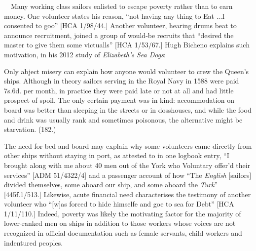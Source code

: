 \begin{styleStandard}
\ \  Many working class sailors enlisted to escape poverty rather than to earn money. One volunteer states his reason, “not having any thing to Eat ...I consented to goo” [HCA 1/98/44.] Another volunteer, hearing drums beat to announce recruitment, joined a group of would-be recruits that “desired the master to give them some victualls” [HCA 1/53/67.] Hugh Bicheno explains such motivation, in his 2012 study of \textit{Elizabeth’s Sea Dogs}:
\end{styleStandard}

\begin{styleStandard}
Only abject misery can explain how anyone would volunteer to crew the Queen’s ships. Although in theory sailors serving in the Royal Navy in 1588 were paid 7s.6d. per month, in practice they were paid late or not at all and had little prospect of spoil. The only certain payment was in kind: accommodation on board was better than sleeping in the streets or in dosshouses, and while the food and drink was usually rank and sometimes poisonous, the alternative might be starvation. (182.)
\end{styleStandard}

\begin{styleStandard}
The need for bed and board may explain why some volunteers came directly from other ships without staying in port, as attested to in one logbook entry, “I brought along with me about 40 men out of the York who Voluntary offer’d their services” [ADM 51/4322/4] and a passenger account of how “The \textit{English} [sailors] divided themselves, some aboard our ship, and some aboard the \textit{Turk}” [445f.1/513.] Likewise, acute financial need characterises the testimony of another volunteer who “[w]as forced to hide himselfe and goe to sea for Debt” [HCA 1/11/110.] Indeed, poverty was likely the motivating factor for the majority of lower-ranked men on ships in addition to those workers whose voices are not recognized in official documentation such as female servants, child workers and indentured peoples.
\end{styleStandard}


